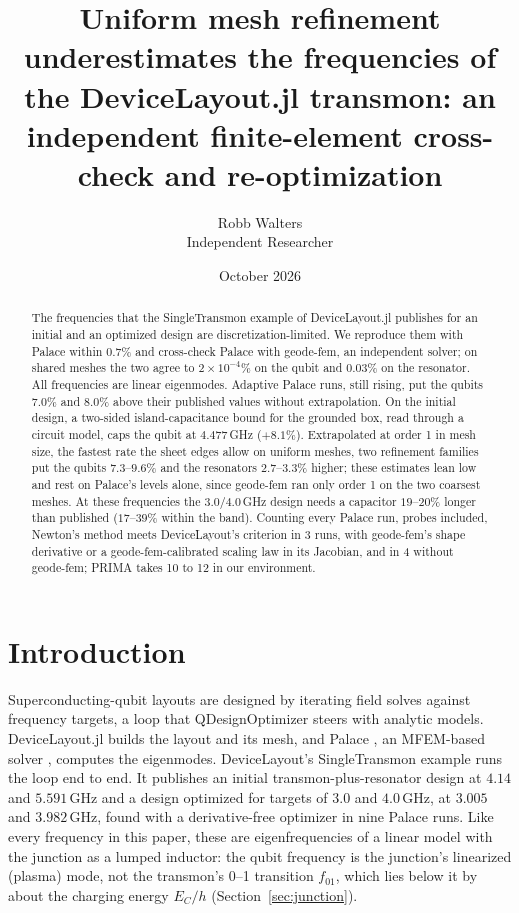 \documentclass{anvil-paper}
\title{Uniform mesh refinement underestimates the frequencies of the
DeviceLayout.jl transmon: an independent finite-element cross-check and
re-optimization}
\author{Robb Walters\\
  {\normalsize Independent Researcher}}
\date{October 2026}
\begin{document}
\maketitle

\begin{abstract}
The frequencies that the SingleTransmon example of DeviceLayout.jl
publishes for an initial and an optimized design are
discretization-limited. We reproduce them with Palace within $0.7\%$ and
cross-check Palace with geode-fem, an independent solver;
on shared meshes the two agree to $2\times10^{-4}\%$ on the qubit and
$0.03\%$ on the resonator. All frequencies are linear eigenmodes. Adaptive
Palace runs, still rising, put the qubits $7.0\%$ and $8.0\%$ above their
published values without extrapolation. On the initial design, a two-sided
island-capacitance bound for the grounded box, read through
a circuit model, caps the qubit at $4.477$\,GHz ($+8.1\%$). Extrapolated at order 1 in
mesh size, the fastest rate the sheet edges allow on uniform
meshes, two refinement families put the qubits $7.3$--$9.6\%$ and the
resonators $2.7$--$3.3\%$ higher; these estimates
lean low and rest on Palace's levels alone, since geode-fem ran only order
1 on the two coarsest meshes. At these frequencies the $3.0$/$4.0$\,GHz design
needs a capacitor $19$--$20\%$ longer than published ($17$--$39\%$ within
the band). Counting every Palace run, probes included, Newton's method meets DeviceLayout's
criterion in 3 runs, with geode-fem's shape derivative or a
geode-fem-calibrated scaling law in its Jacobian, and in 4 without
geode-fem; PRIMA takes 10 to 12 in our environment.
\end{abstract}

\section{Introduction}
\label{sec:intro}

Superconducting-qubit layouts are designed by iterating field solves
against frequency targets, a loop that QDesignOptimizer
\citep{eriksson2025automated} steers with analytic models. DeviceLayout.jl \citep{devicelayout} builds the layout and
its mesh, and Palace \citep{palace}, an MFEM-based solver \citep{mfem},
computes the eigenmodes. DeviceLayout's SingleTransmon example
\citep{devicelayout-blog,devicelayout-example} runs the loop end to end. It
publishes an initial transmon-plus-resonator design at $4.14$ and
$5.591$\,GHz and a design optimized for targets of $3.0$ and $4.0$\,GHz, at
$3.005$ and $3.982$\,GHz, found with a derivative-free optimizer in nine
Palace runs. Like every frequency in this paper, these are eigenfrequencies
of a linear model with the junction as a lumped inductor: the qubit
frequency is the junction's linearized (plasma) mode, not the transmon's
0--1 transition $f_{01}$, which lies below it by about the charging energy
$E_C/h$ (Section~\ref{sec:junction}).
\end{document}
